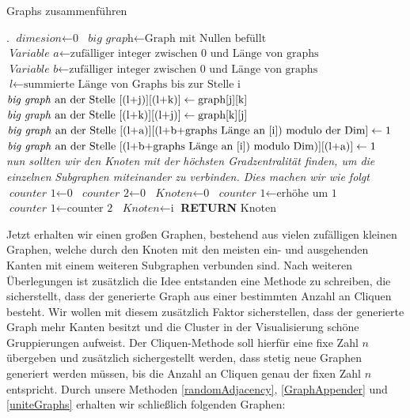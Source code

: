 \begin{algorithm}
\caption{Graphs zusammenführen}\label{uniteGraphs}
\begin{algorithmic}[1]
\State {}.
\EndIf
\State $\textit{dimesion} \gets \text{0}$
\State $\textit{big graph} \gets \text{Graph mit Nullen befüllt}$
\State $\textit{Variable a} \gets \text{zufälliger integer zwischen 0 und Länge von graphs}$
\State $\textit{Variable b} \gets \text{zufälliger integer zwischen 0 und Länge von graphs}$
\State $\textit{l} \gets \text{summierte Länge von Graphs bis zur Stelle i}$
\State $\text{\textit{big graph} an der Stelle [(l+j)][(l+k)]} \gets \text{graph[j][k]}$
\State $\text{\textit{big graph} an der Stelle [(l+k)][(l+j)]} \gets \text{graph[k][j]}$
\State $\text{\textit{big graph} an der Stelle [(l+a)][(l+b+graphs Länge an [i]) modulo der Dim]} \gets \text{1}$
\State $\text{\textit{big graph} an der Stelle [(l+b+graphs Länge an [i]) modulo Dim)][(l+a)]} \gets \text{1}$
\EndFor
\EndFor
\\
\textit{nun sollten wir den Knoten mit der höchsten Gradzentralität finden, um die einzelnen}
\textit{Subgraphen miteinander zu verbinden. Dies machen wir wie folgt}\\
\State $\textit{counter 1} \gets \text{0}$
\State $\textit{counter 2} \gets \text{0}$
\State $\textit{Knoten} \gets \text{0}$
\State $\textit{counter 1} \gets \text{erhöhe um 1}$
\State $\textit{counter 1} \gets \text{counter 2}$
\State $\textit{Knoten} \gets \text{i}$
\EndIf
\EndIf
\EndFor
\textbf{RETURN} Knoten 
\EndProcedure
\end{algorithmic}
\end{algorithm}

Jetzt erhalten wir einen großen Graphen, bestehend aus vielen zufälligen kleinen Graphen, welche durch den Knoten mit den meisten ein- und ausgehenden Kanten mit einem weiteren Subgraphen verbunden sind.
Nach weiteren Überlegungen ist zusätzlich die Idee entstanden eine Methode zu schreiben, die sicherstellt, dass der generierte Graph aus einer bestimmten Anzahl an Cliquen besteht. Wir wollen mit diesem zusätzlich Faktor sicherstellen, dass der generierte Graph mehr Kanten besitzt und die Cluster in der Visualisierung schöne Gruppierungen aufweist. Der Cliquen-Methode soll hierfür eine fixe Zahl $n$ übergeben und zusätzlich sichergestellt werden, dass stetig neue Graphen generiert werden müssen, bis die Anzahl an Cliquen genau der fixen Zahl $n$ entspricht.
Durch unsere Methoden \ref{randomAdjacency}, \ref{GraphAppender} und \ref{uniteGraphs} erhalten wir schließlich folgenden Graphen:

